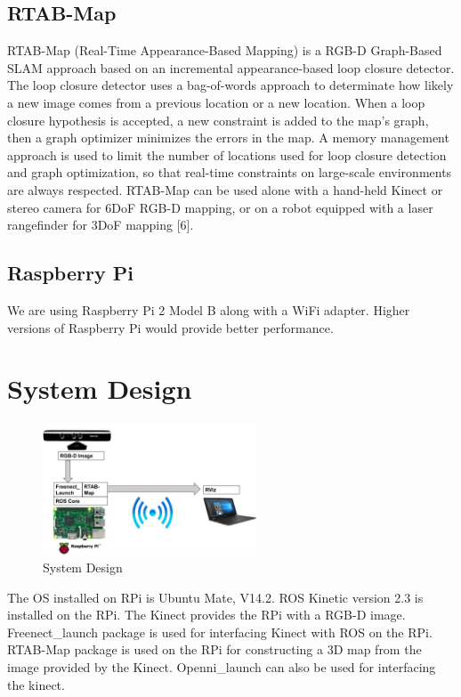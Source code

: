 \documentclass[journal]{IEEEtran}
\begin{document}
\subsection{RTAB-Map}
RTAB-Map (Real-Time Appearance-Based Mapping) is a RGB-D Graph-Based SLAM approach based on an incremental appearance-based loop closure detector. The loop closure detector uses a bag-of-words approach to determinate how likely a new image comes from a previous location or a new location. When a loop closure hypothesis is accepted, a new constraint is added to the map’s graph, then a graph optimizer minimizes the errors in the map. A memory management approach is used to limit the number of locations used for loop closure detection and graph optimization, so that real-time constraints on large-scale environments are always respected. RTAB-Map can be used alone with a hand-held Kinect or stereo camera for 6DoF RGB-D mapping, or on a robot equipped with a laser rangefinder for 3DoF mapping [6].

\subsection{Raspberry Pi}
We are using Raspberry Pi 2 Model B along with a WiFi adapter. Higher versions of Raspberry Pi would provide better performance.

\section{System Design}
\begin{figure}[ht]
	\centering
	\includegraphics[width=2.5in]{SystemDesign.jpg}
	\caption{System Design}
	\label{fig_sim}
\end{figure}

The OS installed on RPi is Ubuntu Mate, V14.2. ROS Kinetic version 2.3 is installed on the RPi. The Kinect provides the RPi with a RGB-D image. Freenect\_launch package is used for interfacing Kinect with ROS on the RPi. RTAB-Map package is used on the RPi for constructing a 3D map from the image provided by the Kinect. Openni\_launch can also be used for interfacing the kinect.
\end{document}
